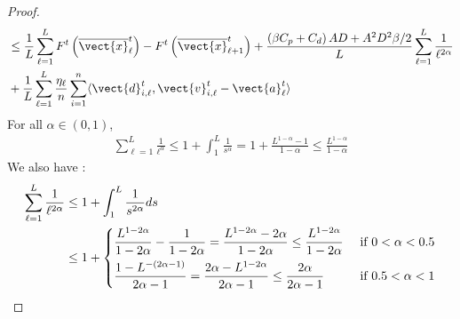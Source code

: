 \begin{proof}
\begin{equation}
\begin{aligned}
        & \leq \frac{1}{L}\sum_{\ell=1}^{L}F^{t} \left( \overline{\vect{x}}^t_{\ell} \right) - F^{t} \left( \overline{\vect{x}}^t_{\ell+1} \right)
        + \frac{ \left( \beta C_p + C_d \right)AD + A^2 D^2 \beta/2}{L}\sum_{\ell=1}^{L} \frac{1}{\ell^{2\alpha}}\\
        &+ \frac{1}{L}\sum_{\ell=1}^{L}\frac{\eta_{\ell}}{n} \sum_{i=1}^{n}\langle \vect{d}^t_{i,\ell}, \vect{v}^t_{i,\ell} - \vect{a}^t_{\ell} \rangle 
    \end{aligned}
\end{equation} 
\newline
For all $\alpha \in (0, 1)$, 
\begin{equation}
\begin{aligned}
    \sum_{\ell=1}^{L} \frac{1}{\ell^{\alpha}} \leq 1 + \int_{1}^L \frac{1}{s^{\alpha}} = 1 + \frac{L^{1-\alpha} - 1}{1-\alpha} \leq \frac{L^{1-\alpha}}{1-\alpha}
\end{aligned}
\end{equation} We also have :
\begin{equation}
    \begin{aligned}
        \sum_{\ell=1}^{L} \frac{1}{\ell^{2\alpha}}
        & \leq 1 + \int_{1}^{L} \frac{1}{s^{2\alpha}}ds \\
        & \leq 1 +  \begin{dcases}
            \frac{L^{1-2\alpha}}{1-2\alpha} - \frac{1}{1-2\alpha} = \frac{L^{1-2\alpha} - 2\alpha}{1-2\alpha} \leq \frac{L^{1-2\alpha}}{1-2\alpha} &\text{ if } 0 < \alpha < 0.5\\
            \frac{1-L^{-(2\alpha-1)}}{2\alpha-1} = \frac{2\alpha - L^{1-2\alpha}}{2\alpha - 1} \leq \frac{2\alpha}{2\alpha - 1} &\text{ if } 0.5 < \alpha < 1 \\
            \end{dcases} 
    \end{aligned}
\end{equation} 


\end{proof}
